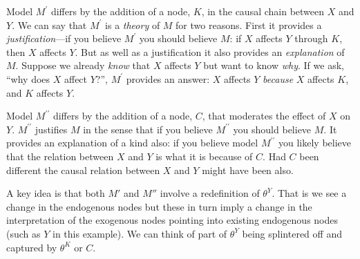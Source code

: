 \documentclass[
  12pt,
]{book}
\begin{document}
Model \(M^\prime\) differs by the addition of a node, \(K\), in the causal chain between \(X\) and \(Y\). We can say that \(M^\prime\) is a \emph{theory} of \(M\) for two reasons. First it provides a \emph{justification}---if you believe \(M^\prime\) you should believe \(M\): if \(X\) affects \(Y\) through \(K\), then \(X\) affects \(Y\). But as well as a justification it also provides an \emph{explanation} of \(M\). Suppose we already \emph{know} that \(X\) affects \(Y\) but want to know \emph{why}. If we ask, ``why does \(X\) affect \(Y\)?'', \(M^\prime\) provides an answer: \(X\) affects \(Y\) \emph{because} \(X\) affects \(K\), and \(K\) affects \(Y\).

Model \(M^{\prime\prime}\) differs by the addition of a node, \(C\), that moderates the effect of \(X\) on \(Y\). \(M^{\prime\prime}\) justifies \(M\) in the sense that if you believe \(M^{\prime\prime}\) you should believe \(M\). It provides an explanation of a kind also: if you believe model \(M^{\prime\prime}\) you likely believe that the relation between \(X\) and \(Y\) is what it is because of \(C\). Had \(C\) been different the causal relation between \(X\) and \(Y\) might have been also.

A key idea is that both \(M'\) and \(M''\) involve a redefinition of \(\theta^Y\). That is we see a change in the endogenous nodes but these in turn imply a change in the interpretation of the exogenous nodes pointing into existing endogenous nodes (such as \(Y\) in this example). We can think of part of \(\theta^Y\) being splintered off and captured by \(\theta^K\) or \(C\).
\end{document}
